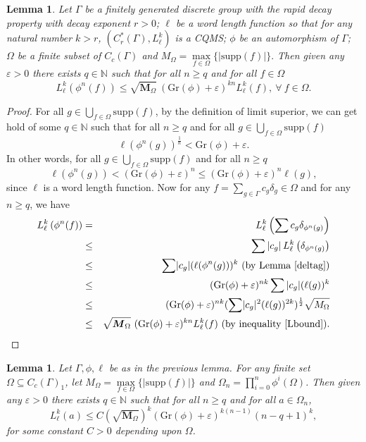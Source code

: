 \documentclass[a4paper,11pt,reqno]{amsart}
\theoremstyle{plain}
\newtheorem{lem}[thm]{Lemma}
\theoremstyle{mainthmstyle}
\theoremstyle{named}
\numberwithin{equation}{section}
\def\M{\boldsymbol M}
\newcommand{\Bea}{\begin{eqnarray*}}
\newcommand{\Eea}{\end{eqnarray*}}
\begin{document}
\begin{lem} \label{lem 2.23}
Let $\Gamma$ be a finitely generated discrete group with the rapid decay property with decay exponent $r>0$; $\ell$ be a word length function so that for any natural number $k>r$, $(C^{\ast}_{r}(\Gamma),L^{k}_{\ell})$ is a CQMS; $\phi$ be an automorphism of $\Gamma$; $\Omega$ be a finite subset of $C_{c}(\Gamma)$ and $M_{\Omega}=\max\limits_{f\in \Omega}\{\lvert\mathrm{supp}(f)\rvert\}.$ Then given any $\varepsilon > 0$ there exists $q \in \mathbb N$ such that for all $n \geq q$ and for all $f \in \Omega$ 
\begin{displaymath}
    L^{k}_{\ell}(\phi^{n}(f))\leq \sqrt{\M_{\Omega}}\ (\mathrm{Gr}(\phi) + \varepsilon)^{kn}L^{k}_{\ell}(f), \ \forall \ f\in\Omega.
\end{displaymath}
\end{lem}
\begin{proof}
  For all $g \in \bigcup\limits_{f \in \Omega} \mathrm {supp} (f)$, by the definition of limit superior, we can get hold of some $q \in \mathbb N$ such that for all $n \geq q$ and for all $g \in \bigcup\limits_{f \in \Omega} \mathrm {supp} (f)$
$$\ell (\phi^{n} (g))^{\frac {1} {n}} < \mathrm{Gr}(\phi) + \varepsilon.$$ In other words, for all $g \in \bigcup\limits_{f \in \Omega} \mathrm {supp} (f)$ and for all $n \geq q$ $$\ell (\phi^{n} (g)) < (\mathrm{Gr}(\phi) + \varepsilon)^{n} \leq (\mathrm{Gr}(\phi) + \varepsilon)^{n} \ell (g),$$ since $\ell$ is a word length function. Now for any $f = \sum\limits_{g \in \Gamma} c_{g} \delta_{g} \in \Omega$ and for any $n \geq q$, we have  \Bea
        L^{k}_{\ell} \left (\phi^{n}(f) \right )& = & L^{k}_{\ell} \left (\sum c_{g}\delta_{\phi^{n}(g)} \right )\\
        & \leq & \sum \left \lvert c_{g} \right \rvert L^{k}_{\ell} \left (\delta_{\phi^{n}(g)} \right )\\ 
        & \leq & \sum \lvert c_{g}\rvert (\ell(\phi^{n}(g)))^{k}\ (\mathrm{by\ Lemma}\ \ref{deltag}) \\
        & \leq & (\mathrm{Gr}(\phi) + \varepsilon)^{nk}\sum |c_{g}|(\ell(g))^{k}\\
        & \leq & (\mathrm{Gr}(\phi) + \varepsilon)^{nk} (\sum \lvert c_{g}\rvert^{2}(\ell(g))^{2k})^{\frac{1}{2}}\sqrt{M_{\Omega}}\\
        & \leq & \sqrt{\M_{\Omega}}\ (\mathrm{Gr}(\phi) + \varepsilon)^{kn}L^{k}_{\ell}(f) \ (\mathrm{by} \ \mathrm{inequality} \ \ref{Lbound}).
    \Eea
\end{proof}
\begin{lem} \label{lem 2.24}
Let $\Gamma, \phi,\ell$ be as in the previous lemma. For any finite set $\Omega\subseteq C_{c}(\Gamma)_1$, let $M_{\Omega}=\max\limits_{f\in \Omega}\{\lvert\mathrm{supp}(f)\rvert\}$ and $\Omega_{n}=\prod_{i=0}^{n}\phi^{i}(\Omega)$. Then given any $\varepsilon > 0$ there exists $q \in \mathbb N$ such that for all $n \geq q$ and for all $a \in \Omega_n$,
\begin{displaymath}
    L_{\ell}^{k} (a)\leq C \left (\sqrt{\M_{\Omega}} \right )^{k}( \mathrm{Gr}(\phi)+\varepsilon)^{k (n - 1)} (n - q + 1)^k,
\end{displaymath}
for some constant $C > 0$ depending upon $\Omega$.
\end{lem}
\end{document}
